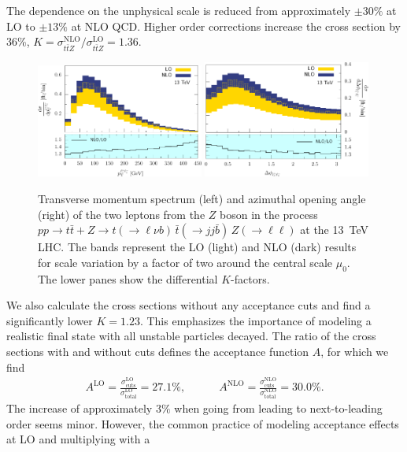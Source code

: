 \documentclass{JHEP3}
\def\ttb{t\bar{t}}
\newcommand{\be}{\begin{eqnarray}}
\newcommand{\ee}{\end{eqnarray}}
\begin{document}
The dependence on the unphysical scale is reduced from approximately $\pm 30\%$ at LO to $\pm 13\%$ at NLO QCD.
Higher order corrections increase the cross section by 36\%, $K= \sigma_{\ttb Z}^\mathrm{NLO} \big/  \sigma_{\ttb Z}^\mathrm{LO}=1.36$.
\begin{figure}[t]
\centering 
\includegraphics[width=0.49\textwidth]{./LHC_53_Fig12.pdf}
\includegraphics[width=0.49\textwidth]{./LHC_53_Fig17.pdf}
\caption{\label{fig:ii} Transverse momentum spectrum (left) and azimuthal opening angle (right) of the two leptons from the $Z$ boson 
in the process $pp \to \ttb + Z \to t(\to \ell \nu b) \, \bar{t} (\to jj \bar{b}) \, Z(\to \ell \ell)$ at the 13~TeV LHC.
The bands represent the LO (light) and NLO (dark) results for scale variation by a factor of two around the central scale $\mu_0$.
The lower panes show the differential $K$-factors.
}
\end{figure}
We also calculate the cross sections without any acceptance cuts and
find a significantly lower $K=1.23$.  This emphasizes the importance
of modeling a realistic final state with all unstable particles
decayed.  The ratio of the cross sections with and without cuts
defines the acceptance function $A$, for which we find 
\be
  A^\mathrm{LO} =
  \frac{\sigma_{\mathrm{cuts}}^\mathrm{LO}}{\sigma_{\mathrm{total}}^\mathrm{LO}}
  = 27.1 \%, \quad\quad\quad A^\mathrm{NLO} =
  \frac{\sigma_{\mathrm{cuts}}^\mathrm{NLO}}{\sigma_{\mathrm{total}}^\mathrm{NLO}}
  = 30.0 \%.  
\ee 
The increase of approximately $3\%$ when going from
leading to next-to-leading order seems minor.  However, the common
practice of modeling acceptance effects at LO and multiplying with a
\end{document}
